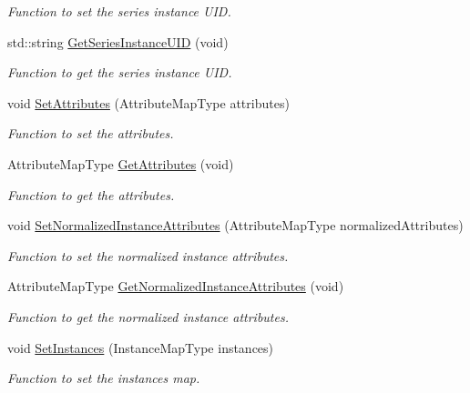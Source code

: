 \begin{DoxyCompactItemize}
\begin{DoxyCompactList}\small\item\em Function to set the series instance UID. \item\end{DoxyCompactList}\item 
std::string \hyperlink{class_series_a70b342c95387d5296a47b5ee3889e6a7}{GetSeriesInstanceUID} (void)
\begin{DoxyCompactList}\small\item\em Function to get the series instance UID. \item\end{DoxyCompactList}\item 
void \hyperlink{class_series_a484423abfdf029cf55cb198fd930661c}{SetAttributes} (AttributeMapType attributes)
\begin{DoxyCompactList}\small\item\em Function to set the attributes. \item\end{DoxyCompactList}\item 
AttributeMapType \hyperlink{class_series_ac092ee2e77b02c7db1eecc3092a63507}{GetAttributes} (void)
\begin{DoxyCompactList}\small\item\em Function to get the attributes. \item\end{DoxyCompactList}\item 
void \hyperlink{class_series_a097ba94fe78e7171b72188612ca37258}{SetNormalizedInstanceAttributes} (AttributeMapType normalizedAttributes)
\begin{DoxyCompactList}\small\item\em Function to set the normalized instance attributes. \item\end{DoxyCompactList}\item 
AttributeMapType \hyperlink{class_series_a161fd29df0c0d94a25f9fe32b5d7417d}{GetNormalizedInstanceAttributes} (void)
\begin{DoxyCompactList}\small\item\em Function to get the normalized instance attributes. \item\end{DoxyCompactList}\item 
void \hyperlink{class_series_a9311b0104e5d084cb1f39e0d0dd0f5c0}{SetInstances} (InstanceMapType instances)
\begin{DoxyCompactList}\small\item\em Function to set the instances map. \item\end{DoxyCompactList}\item 

\end{DoxyCompactItemize}
